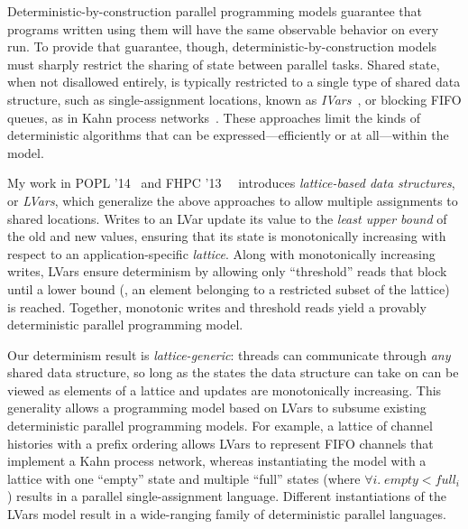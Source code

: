 \documentclass{article}
\begin{document}
Deterministic-by-construction parallel programming models guarantee
that programs written using them will have the same observable
behavior on every run.  To provide that guarantee, though,
deterministic-by-construction models must sharply restrict the sharing
of state between parallel tasks.  Shared state, when not disallowed
entirely, is typically restricted to a single type of shared data
structure, such as single-assignment locations, known as
\emph{IVars}~\cite{IStructures, CnC}, or blocking FIFO queues, as in
Kahn process networks~\cite{Kahn-1974}.  These approaches limit the
kinds of deterministic algorithms that can be expressed---efficiently
or at all---within the model.

My work in POPL '14~\cite{Freeze-paper}\nocite{Freeze-TR} and FHPC
'13~~\cite{LVars-paper}\nocite{LVars-TR} introduces \emph{lattice-based data
  structures}, or \emph{LVars}, which generalize the above approaches
to allow multiple assignments to shared locations.  Writes to an LVar
update its value to the \emph{least upper bound} of the old and new
values, ensuring that its state is monotonically increasing with
respect to an application-specific \emph{lattice}.  Along with
monotonically increasing writes, LVars ensure determinism by allowing
only ``threshold'' reads that block until a lower bound (\ie, an
element belonging to a restricted subset of the lattice) is reached.
Together, monotonic writes and threshold reads yield a provably
deterministic parallel programming model.

Our determinism result is \emph{lattice-generic}: threads can
communicate through \emph{any} shared data structure, so long as the
states the data structure can take on can be viewed as elements of a
lattice and updates are monotonically increasing.  This generality
allows a programming model based on LVars to subsume existing
deterministic parallel programming models.  For example, a lattice of
channel histories with a prefix ordering allows LVars to represent
FIFO channels that implement a Kahn process network, whereas
instantiating the model with a lattice with one ``empty'' state and
multiple ``full'' states (where $\forall{i}.\; \mathit{empty} <
\mathit{full_i}$) results in a parallel single-assignment language.
Different instantiations of the LVars model result in a wide-ranging
family of deterministic parallel languages.
\end{document}
